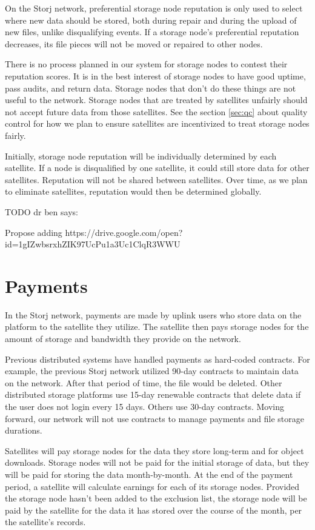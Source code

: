 \documentclass[11pt,fleqn,openany]{book}
\newcommand{\todo}[1]{{\color{red} TODO #1 }}
\begin{document}
On the Storj network, preferential storage node reputation is only used to
select where new data should be stored, both during repair and during the
upload of new files, unlike disqualifying events.
If a storage node's preferential reputation decreases, its file pieces will not
be moved or repaired to other nodes.

There is no process planned in our system for storage nodes to contest their
reputation scores. It is in the best interest of storage nodes to have good
uptime, pass audits, and return data. Storage nodes that don't do these things
are not useful to the network. Storage nodes that are treated by satellites
unfairly should not accept future data from those satellites. See the section
\ref{sec:qc} about quality control for how we plan to ensure satellites are
incentivized to treat storage nodes fairly.

Initially, storage node reputation will be individually determined by each
satellite. If a node is disqualified by one satellite, it could still
store data for other satellites. Reputation will not be shared between
satellites. Over time, as we plan to eliminate satellites,
reputation would then be determined globally.

\todo{dr ben says:

Propose adding https://drive.google.com/open?id=1gIZwbsrxhZIK97UcPu1a3Uc1ClqR3WWU
}

\section{Payments}\label{sec:concrete-payments}

In the Storj network, payments are made by uplink users who store data on the
platform to the satellite they utilize.
The satellite then pays storage nodes for the amount of storage and bandwidth
they
provide on the network.

Previous distributed systems have handled payments as hard-coded contracts.
For example, the previous Storj network utilized 90-day contracts to maintain
data on the network. After that period of time, the file would be deleted.
Other distributed storage platforms use 15-day renewable contracts that delete
data if the user does not login every 15 days. Others use 30-day contracts.
Moving forward, our network will not use contracts to manage payments and file
storage durations.

Satellites will pay storage nodes for the data they store long-term
and for object downloads.
Storage nodes will not be paid for the initial storage of data, but they
will be paid for storing the data month-by-month. At the end of the payment
period, a satellite will calculate earnings for each of its storage nodes.
Provided the storage node hasn't been added to the exclusion list,
the storage node will be paid by the satellite for the data it has stored
over the course of
the month, per the satellite's records.
\end{document}
